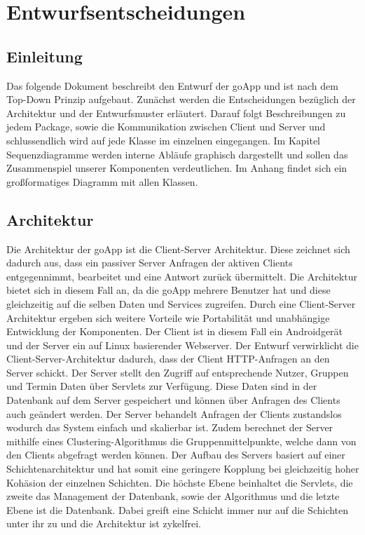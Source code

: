 

\section{Entwurfsentscheidungen}
	\subsection{Einleitung}
	Das folgende Dokument beschreibt den Entwurf der goApp und ist nach dem Top-Down Prinzip aufgebaut.
	Zunächst werden die Entscheidungen bezüglich der Architektur und der Entwurfsmuster erläutert.
	Darauf folgt Beschreibungen zu jedem Package, sowie die Kommunikation zwischen Client und Server und schlussendlich wird auf jede Klasse im einzelnen eingegangen.
	Im Kapitel Sequenzdiagramme werden interne Abläufe graphisch dargestellt und sollen das Zusammenspiel unserer Komponenten verdeutlichen. 
	Im Anhang findet sich ein großformatiges Diagramm mit allen Klassen.
	
	\subsection{Architektur}
	Die Architektur der goApp ist die Client-Server Architektur. Diese zeichnet sich dadurch aus, dass ein passiver Server Anfragen der aktiven Clients entgegennimmt, bearbeitet und eine Antwort zurück übermittelt. Die Architektur bietet sich in diesem Fall an, da die goApp mehrere Benutzer hat und diese gleichzeitig auf die selben Daten und Services zugreifen. Durch eine Client-Server Architektur ergeben sich weitere Vorteile wie Portabilität und unabhängige Entwicklung der Komponenten.
Der Client ist in diesem Fall ein Androidgerät und der Server ein auf Linux basierender Webserver.
Der Entwurf verwirklicht die Client-Server-Architektur dadurch, dass der Client HTTP-Anfragen an den Server schickt. Der Server stellt den Zugriff auf entsprechende Nutzer, Gruppen und Termin Daten über Servlets zur Verfügung. Diese Daten sind in der Datenbank auf dem Server gespeichert und können über Anfragen des Clients auch geändert werden.
Der Server behandelt Anfragen der Clients zustandslos wodurch das System einfach und skalierbar ist.
Zudem berechnet der Server mithilfe eines Clustering-Algorithmus die Gruppenmittelpunkte, welche dann von den Clients abgefragt werden können. \newline
Der Aufbau des Servers basiert auf einer Schichtenarchitektur und hat somit eine geringere Kopplung bei gleichzeitig hoher Kohäsion der einzelnen Schichten. Die höchste Ebene beinhaltet die Servlets, die zweite das Management der Datenbank, sowie der Algorithmus und die letzte Ebene ist die Datenbank. Dabei greift eine Schicht immer nur auf die Schichten unter ihr zu und die Architektur ist zykelfrei.
	
